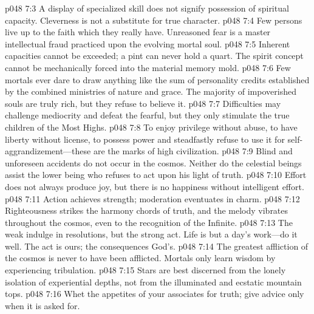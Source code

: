 \pc \vs p048 7:3 \bibnobreakspace A display of specialized skill does not signify possession of spiritual capacity. Cleverness is not a substitute for true character.
\pc \vs p048 7:4 \bibnobreakspace Few persons live up to the faith which they really have. Unreasoned fear is a master intellectual fraud practiced upon the evolving mortal soul.
\pc \vs p048 7:5 \bibnobreakspace Inherent capacities cannot be exceeded; a pint can never hold a quart. The spirit concept cannot be mechanically forced into the material memory mold.
\pc \vs p048 7:6 \bibnobreakspace Few mortals ever dare to draw anything like the sum of personality credits established by the combined ministries of nature and grace. The majority of impoverished souls are truly rich, but they refuse to believe it.
\pc \vs p048 7:7 \bibnobreakspace Difficulties may challenge mediocrity and defeat the fearful, but they only stimulate the true children of the Most Highs.
\pc \vs p048 7:8 \bibnobreakspace To enjoy privilege without abuse, to have liberty without license, to possess power and steadfastly refuse to use it for self\hyp{}aggrandizement---these are the marks of high civilization.
\pc \vs p048 7:9 \bibnobreakspace Blind and unforeseen accidents do not occur in the cosmos. Neither do the celestial beings assist the lower being who refuses to act upon his light of truth.\plusone
\pc \vs p048 7:10 \bibnobreakspace Effort does not always produce joy, but there is no happiness without intelligent effort.
\pc \vs p048 7:11 \bibnobreakspace Action achieves strength; moderation eventuates in charm.
\pc \vs p048 7:12 \bibnobreakspace Righteousness strikes the harmony chords of truth, and the melody vibrates throughout the cosmos, even to the recognition of the Infinite.\plusone
\pc \vs p048 7:13 \bibnobreakspace The weak indulge in resolutions, but the strong act. Life is but a day’s work---do it well. The act is ours; the consequences God’s.\plusone
\pc \vs p048 7:14 \bibnobreakspace The greatest affliction of the cosmos is never to have been afflicted. Mortals only learn wisdom by experiencing tribulation.
\pc \vs p048 7:15 \bibnobreakspace Stars are best discerned from the lonely isolation of experiential depths, not from the illuminated and ecstatic mountain tops.\plusone
\pc \vs p048 7:16 \bibnobreakspace Whet the appetites of your associates for truth; give advice only when it is asked for.
